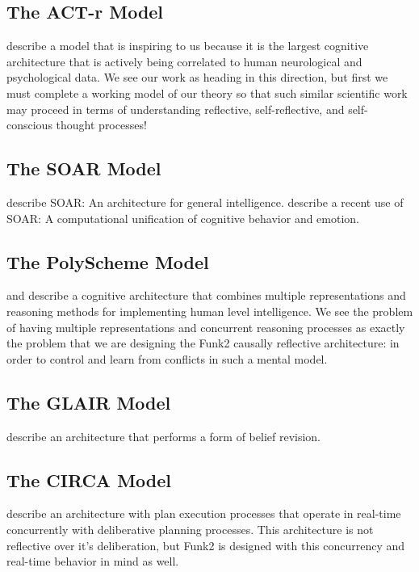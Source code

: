 \subsection{The ACT-r Model}

\cite{anderson2004itm} describe a model that is inspiring to us because it is the largest cognitive architecture that is actively being correlated to human neurological and psychological data.
We see our work as heading in this direction, but first we must complete a working model of our theory so that such similar scientific work may proceed in terms of understanding reflective, self-reflective, and self-conscious thought processes!

\subsection{The SOAR Model}

\cite{laird1987sag} describe SOAR: An architecture for general intelligence.
\cite{marinier2009cuc} describe a recent use of SOAR: A computational unification of cognitive behavior and emotion.

\subsection{The PolyScheme Model}

\cite{cassimatis2004icp} and \cite{cassimatis2006csa} describe a cognitive architecture that combines multiple representations and reasoning methods for implementing human level intelligence.
We see the problem of having multiple representations and concurrent reasoning processes as exactly the problem that we are designing the Funk2 causally reflective architecture: in order to control and learn from conflicts in such a mental model.

\subsection{The GLAIR Model}

\cite{shapiro2003agl} describe an architecture that performs a form of belief revision.

\subsection{The CIRCA Model}

\cite{musliner2001irt} describe an architecture with plan execution processes that operate in real-time concurrently with deliberative planning processes.
This architecture is not reflective over it's deliberation, but Funk2 is designed with this concurrency and real-time behavior in mind as well.

